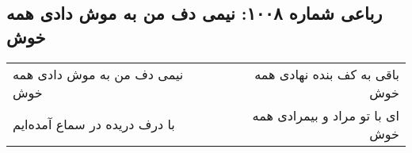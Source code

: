 \begin{center}
\section*{رباعی شماره ۱۰۰۸: نیمی دف من به موش دادی همه خوش}
\label{sec:1008}
\begin{longtable}{l p{0.5cm} r}
نیمی دف من به موش دادی همه خوش
&&
باقی به کف بنده نهادی همه خوش
\\
با درف دریده در سماع آمده‌ایم
&&
ای با تو مراد و بیمرادی همه خوش
\\
\end{longtable}
\end{center}
